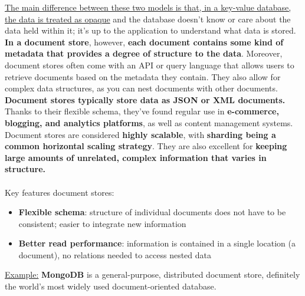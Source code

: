 \documentclass[10pt,a4paper]{article}
\newcommand{\nline}{\\~\\}
\begin{document}
\uline{The main difference between these two models is that, in a key-value database, the data is treated as opaque} and the database doesn’t know or care about the data held within it; it’s up to the application to understand what data is stored. \textbf{In a document store}, however, \textbf{each document contains some kind of metadata that provides a degree of structure to the data}. Moreover, document stores often come with an API or query language that allows users to retrieve documents based on the metadata they contain. They also allow for complex data structures, as you can nest documents with other documents. \\
\textbf{Document stores typically store data as JSON or XML documents.} \\
Thanks to their flexible schema, they’ve found regular use in \textbf{e-commerce, blogging, and analytics platforms}, as well as content management systems. Document stores are considered \textbf{highly scalable}, with \textbf{sharding being a common horizontal scaling strategy}. They are also excellent for \textbf{keeping large amounts of unrelated, complex information that varies in structure.}
\nline
Key features document stores:
\begin{itemize}
	\item \textbf{Flexible schema}: structure of individual documents does not have to be consistent; easier to integrate new information
	\item \textbf{Better read performance}: information is contained in a single location (a document), no relations needed to access nested data
\end{itemize}
\uline{Example:} \textbf{MongoDB} is a general-purpose, distributed document store, definitely the world’s most widely used document-oriented database.
\end{document}
